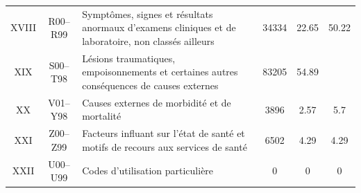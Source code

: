 \documentclass[12pt,english,french,twoside]{report}\usepackage[]{graphicx}\usepackage[]{color}
\begin{document}
\begin{longtable}{|c|c|m{4cm}|c|c|c|}

XVIII&R00–R99&Symptômes, signes et résultats anormaux d'examens cliniques et de laboratoire, non classés ailleurs&34334&22.65&50.22\\

XIX&S00–T98&Lésions traumatiques, empoisonnements et certaines autres conséquences de causes externes&83205&54.89& \\

XX&V01–Y98&Causes externes de morbidité et de mortalité& 3896&2.57&5.7\\

XXI&Z00–Z99&Facteurs influant sur l'état de santé et motifs de recours aux services de santé&6502&4.29&4.29\\

XXII&U00–U99&Codes d'utilisation particulière & 0&0&0\\

  \hline
\end{longtable}
\end{document}
